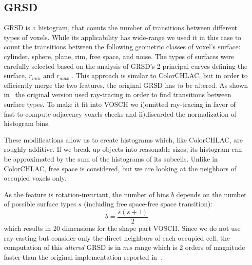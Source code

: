 \documentclass[conference]{sty/IEEEtran}
\begin{document}
\subsection{GRSD}
\label{sec:grsd}
GRSD is a histogram, that counts the number of transitions between different types of voxels.
While its applicability has wide-range we used it in this case to count the transitions between 
the following geometric classes of voxel's surface: cylinder, sphere, plane, rim, free space, and noise. 
The types of surfaces were carefully selected based on the analysis of GRSD's   
2 principal curves defining the surface, $r_{min}$ and $r_{max}$ \cite{Marton10IROS}.
This approach is similar to ColorCHLAC, but in order to efficiently merge the two features, 
the original GRSD has to be altered. As shown  in~\cite{GRSD10Humanoids} the original version used
ray-tracing in order to find transitions between surface types. To make it fit into VOSCH 
we i)omitted ray-tracing in favor of fast-to-compute adjacency voxels checks and ii)discarded
the normalization of histogram bins.

These modifications allow us to create histograms which, like ColorCHLAC, are roughly additive.
If we break up objects into reasonable sizes, its histogram can be approximated by the sum of the
histograms of its subcells. Unlike in ColorCHLAC, free space is considered, but we are looking
at the neighbors of occupied voxels only.

As the feature is rotation-invariant, the number of bins $b$ depends on the number of possible 
surface types $s$ (including free space-free space transition):
\begin{equation}
b=\frac{s(s+1)}{2} %
\end{equation}
which results in 20 dimensions for the shape part VOSCH.
Since we do not use ray-casting but consider only the direct neighbors
of each occupied cell, the computation of this \emph{altered} GRSD is in 
$ms$ range which is 2 orders of magnitude faster than the original implementation
reported in~\cite{GRSD10Humanoids}.
\end{document}
